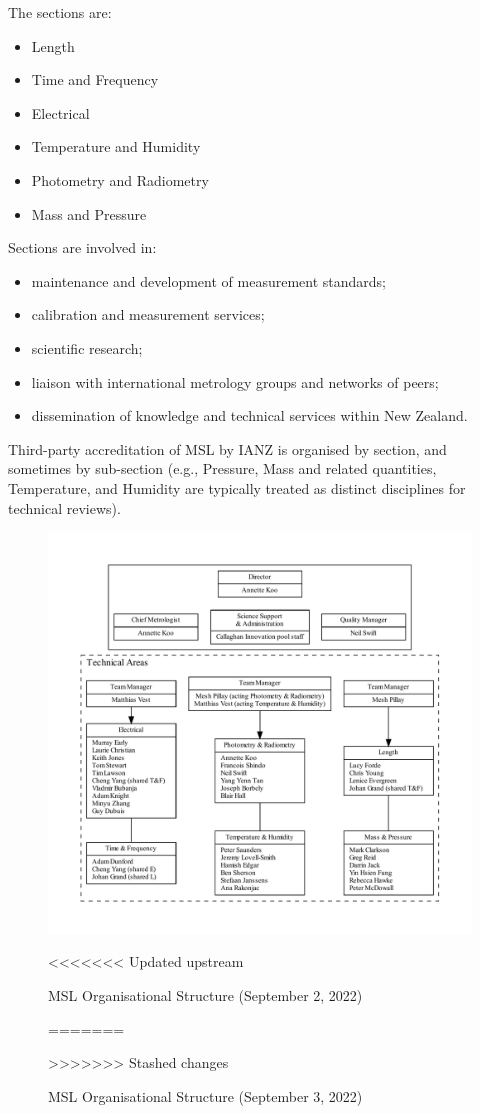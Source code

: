 The sections are: 
\begin{itemize}
\item	Length
\item	Time and Frequency 
\item	Electrical 
\item	Temperature and Humidity
\item	Photometry and Radiometry
\item	Mass and Pressure
\end{itemize}

Sections are involved in:
\begin{itemize}
\item	maintenance and development of measurement standards; 
\item	calibration and measurement services;
\item	scientific research;
\item	liaison with international metrology groups and networks of peers; 
\item	dissemination of knowledge and technical services within New Zealand.
\end{itemize}

Third-party accreditation of MSL by IANZ is organised by section, and sometimes by sub-section (e.g., Pressure, Mass and related quantities, Temperature, and Humidity are typically treated as distinct disciplines for technical reviews).

\begin{figure}
\begin{center}
\includegraphics[width=1.1\textwidth]{pictures/MSL_org_full}
\end{center}
<<<<<<< Updated upstream
\caption{MSL Organisational Structure (September 2, 2022)}
=======
\caption{MSL Organisational Structure (September 3, 2022)}
>>>>>>> Stashed changes
\label{fig:org_msl}
\end{figure}


